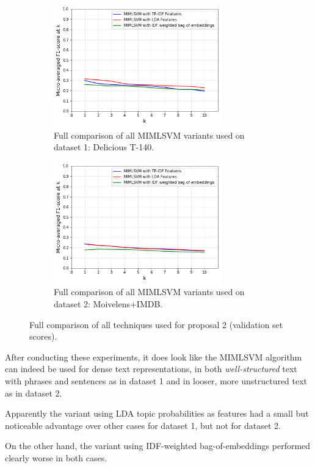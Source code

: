 \begin{figure}[H]
    \begin{subfigure}{0.5\textwidth}
        \centering
    \includegraphics[width=0.8\textwidth]{chapters/05_experiments/images/proposal-2-compared-delicious.png}
    \caption{Full comparison of all MIMLSVM variants used on dataset 1: Delicious T-140.}
    \label{fig:full_comparison_dataset_1}
    \end{subfigure}
    \begin{subfigure}{0.5\textwidth}
        \centering
    \includegraphics[width=0.8\textwidth]{chapters/05_experiments/images/proposal-2-compared-movielens.png}
    \caption{Full comparison of all MIMLSVM variants used on dataset 2: Moivelens+IMDB.}
    \label{fig:full_comparison_dataset_2}
    \end{subfigure}
    \caption{Full comparison of all techniques used for proposal 2 (validation set scores).}
\end{figure}

After conducting these experiments, it does look like the MIMLSVM algorithm can indeed be used for dense text representations, in both \textit{well-structured} text with phrases and sentences as in dataset 1 and in looser, more unstructured text as in dataset 2.

Apparently the variant using LDA topic probabilities as features had a small but noticeable advantage over other cases for dataset 1, but not for dataset 2.

On the other hand, the variant using IDF-weighted bag-of-embeddings performed clearly worse in both cases.